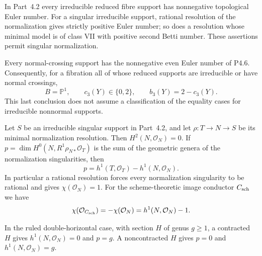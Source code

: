 
\begin{proposition}[P4.26]\hypertarget{tag-02WY}{}\label{night:P4.26}\label{stmt:P4.26}


In Part~4.2 every irreducible reduced fibre support
has nonnegative topological Euler number. For a
singular irreducible support, rational resolution
of the normalization gives strictly positive
Euler number; so does a resolution whose minimal
model is of class VII with positive second
Betti number. These assertions permit singular
normalization.

Every normal-crossing support has the
nonnegative even Euler number of P4.6.
Consequently, for a fibration all of whose
reduced supports are irreducible or have
normal crossings,
\[
 B=\mathbb P^1,\qquad c_3(Y)\in\{0,2\},
 \qquad b_3(Y)=2-c_3(Y).
\]
This last conclusion does not assume a
classification of the equality cases for
irreducible nonnormal supports.
\end{proposition}

\begin{proposition}[P4.33]\hypertarget{tag-02X6}{}\label{night:P4.33}\label{stmt:P4.33}


Let $S$ be an irreducible singular support in Part~4.2, and let
$\rho:T\to N\to S$ be its minimal normalization resolution.
Then $H^2(N,\mathcal O_N)=0$. If
$p=\dim H^0(N,R^1\rho_{N*}\mathcal O_T)$ is the sum of the
geometric genera of the normalization singularities, then
\[
 p=h^1(T,\mathcal O_T)-h^1(N,\mathcal O_N).
\]
In particular a rational resolution forces every normalization
singularity to be rational and gives $\chi(\mathcal O_N)=1$.
For the scheme-theoretic image conductor $C_{\rm sch}$ we have
\[
 \chi(\mathcal O_{C_{\rm sch}})
   =-\chi(\mathcal O_N)=h^1(N,\mathcal O_N)-1.
\]

In the ruled double-horizontal case, with section $H$ of genus
$g\ge1$, a contracted $H$ gives $h^1(N,\mathcal O_N)=0$ and
$p=g$. A noncontracted $H$ gives $p=0$ and
$h^1(N,\mathcal O_N)=g$.
\end{proposition}

